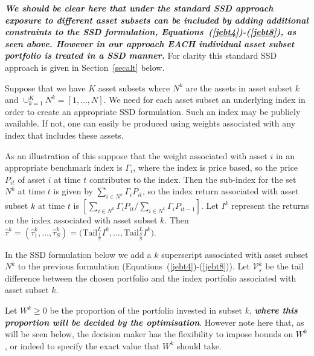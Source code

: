 \emph{\textbf{We should be clear here that under the standard SSD approach exposure to different asset subsets can be included 
by adding additional constraints to the SSD formulation, Equations~(\ref{jebt4})-(\ref{jebt8}), as seen above. However in our approach 
EACH individual asset subset portfolio is  treated in a SSD manner.}} For clarity this standard  SSD approach is given in Section~\ref{secalt} below.


Suppose that we have $K$ asset subsets where $N^k$ are the assets in asset subset $k$ and $\cup^K_{k=1} N^k= [1,...,N]$. 
We need for each asset subset an underlying index in order to create an appropriate SSD formulation. Such an index may be publicly available. If not,
 one can easily be produced using weights associated with any index that includes these assets. 

As an illustration of this suppose that the weight associated with asset $i$ in an appropriate benchmark index is $\Gamma_i$, where the index is price based, so  the price $P_{it}$ of asset $i$ at time $t$ contributes to the index. Then the sub-index for the set $N^k$ at time $t$ is given by $\sum_{i \in N^k} \Gamma_i P_{it}$, so the index return associated with asset subset $k$ at time $t$ is $\left[\sum_{i \in N^k} \Gamma_i P_{it}/\sum_{i \in N^k} \Gamma_i P_{it-1}\right]$.
Let $I^k$ represent the returns on the index associated with asset subset $k$. Then $\hat{\tau}^k = (\hat{\tau}^k_1, \ldots, \hat{\tau}^k_S) = \big( \text{Tail}^L_{\frac{1}{S}} I^k, \ldots, \text{Tail}^L_{\frac{S}{S}} I^k \big)$.



In the SSD formulation below we add a $k$ superscript associated with asset subset $N^k$ to the previous formulation (Equations~(\ref{jebt4})-(\ref{jebt8})). 
Let  $\mathcal{V}_s^k$ be the tail difference between the chosen portfolio and the index portfolio associated with asset subset $k$.



Let $W^k \geq 0$ be the proportion of the portfolio invested in subset $k$, \emph{\textbf{where this proportion will be decided by the optimisation}}. However note here that, as will be seen below, the decision maker has the flexibility to impose bounds on $W^k$, or indeed to specify the exact value that $W^k$ should take.  


